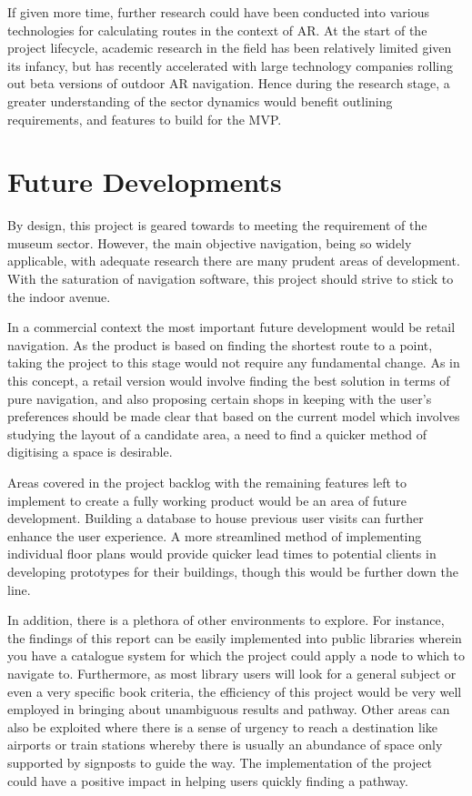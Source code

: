 If given more time, further research could have been conducted into various technologies for calculating routes in the context of AR. At the start of the project lifecycle, academic research in the field has been relatively limited given its infancy, but has recently accelerated with large technology companies rolling out beta versions of outdoor AR navigation. Hence during the research stage, a greater understanding of the sector dynamics would benefit outlining requirements, and features to build for the MVP.

\section{Future Developments}
By design, this project is geared towards to meeting the requirement of the museum sector. However, the main objective navigation, being so widely applicable, with adequate research there are many prudent areas of development. With the saturation of navigation software, this project should strive to stick to the indoor avenue. 

In a commercial context the most important future development would be retail navigation. As the product is based on finding the shortest route to a point, taking the project to this stage would not require any fundamental change. As in this concept, a retail version would involve finding the best solution in terms of pure navigation, and also proposing certain shops in keeping with the user’s preferences should be made clear that based on the current model which involves studying the layout of a candidate area, a need to find a quicker method of digitising a space is desirable. 

Areas covered in the project backlog with the remaining features left to implement to create a fully working product would be an area of future development. Building a database to house previous user visits can further enhance the user experience. A more streamlined method of implementing individual floor plans would provide quicker lead times to potential clients in developing prototypes for their buildings, though this would be further down the line.

In addition, there is a plethora of other environments to explore. For instance, the findings of this report can be easily implemented into public libraries wherein you have a catalogue system for which the project could apply a node to which to navigate to. Furthermore, as most library users will look for a general subject or even a very specific book criteria, the efficiency of this project would be very well employed in bringing about unambiguous results and pathway. Other areas can also be exploited where there is a sense of urgency to reach a destination like airports or train stations whereby there is usually an abundance of space only supported by signposts to guide the way. The implementation of the project could have a positive impact in helping users quickly finding a pathway.
